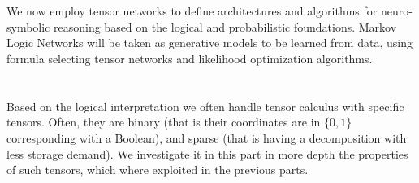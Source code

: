 \documentclass[aps,onecolumn,nofootinbib,pra]{article}
\begin{document}
\part{\parttwotext}\label{par:two}

We now employ tensor networks to define architectures and algorithms for neuro-symbolic reasoning based on the logical and probabilistic foundations.
Markov Logic Networks will be taken as generative models to be learned from data, using formula selecting tensor networks and likelihood optimization algorithms.











\part{\partthreetext}\label{par:three}

Based on the logical interpretation we often handle tensor calculus with specific tensors.
Often, they are binary (that is their coordinates are in $\{0,1\}$ corresponding with a Boolean), and sparse (that is having a decomposition with less storage demand).
We investigate it in this part in more depth the properties of such tensors, which where exploited in the previous parts.














\appendix




\end{document}
